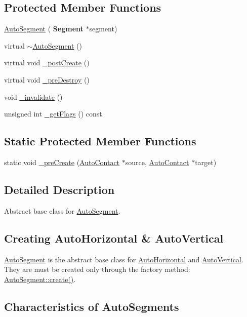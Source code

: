 \subsection*{Protected Member Functions}
\begin{DoxyCompactItemize}
\item 
\hyperlink{classKatabatic_1_1AutoSegment_ae64a61508d148cb4a0ee9b5ffb177659}{Auto\+Segment} (\textbf{ Segment} $\ast$segment)
\item 
virtual \hyperlink{classKatabatic_1_1AutoSegment_a5d135025de0c1725d6252099c2e70e2b}{$\sim$\+Auto\+Segment} ()
\item 
virtual void \hyperlink{classKatabatic_1_1AutoSegment_a3715b38135ca24745f610bebd3407c10}{\+\_\+post\+Create} ()
\item 
virtual void \hyperlink{classKatabatic_1_1AutoSegment_a7c13d9795eafd477994961f8a0d962d0}{\+\_\+pre\+Destroy} ()
\item 
void \hyperlink{classKatabatic_1_1AutoSegment_a6a98d2e5839b880893703ad45db4e4c4}{\+\_\+invalidate} ()
\item 
unsigned int \hyperlink{classKatabatic_1_1AutoSegment_ae5b4a4f67d480cd5c9ce104e73e73da9}{\+\_\+get\+Flags} () const
\end{DoxyCompactItemize}
\subsection*{Static Protected Member Functions}
\begin{DoxyCompactItemize}
\item 
static void \hyperlink{classKatabatic_1_1AutoSegment_a8348937b1db79480305b178482d3ed61}{\+\_\+pre\+Create} (\hyperlink{classKatabatic_1_1AutoContact}{Auto\+Contact} $\ast$source, \hyperlink{classKatabatic_1_1AutoContact}{Auto\+Contact} $\ast$target)
\end{DoxyCompactItemize}


\subsection{Detailed Description}
Abstract base class for \hyperlink{classKatabatic_1_1AutoSegment}{Auto\+Segment}. 

\hypertarget{classKatabatic_1_1AutoSegment_secASCreation}{}\subsection{Creating Auto\+Horizontal \& Auto\+Vertical}\label{classKatabatic_1_1AutoSegment_secASCreation}
\hyperlink{classKatabatic_1_1AutoSegment}{Auto\+Segment} is the abstract base class for \hyperlink{classKatabatic_1_1AutoHorizontal}{Auto\+Horizontal} and \hyperlink{classKatabatic_1_1AutoVertical}{Auto\+Vertical}. They are must be created only through the factory method\+: \hyperlink{classKatabatic_1_1AutoSegment_ab0cc9e57beeceec519cd4bd3e415569e}{Auto\+Segment\+::create()}.\hypertarget{classKatabatic_1_1AutoSegment_secASCharacteristics}{}\subsection{Characteristics of Auto\+Segments}\label{classKatabatic_1_1AutoSegment_secASCharacteristics}

